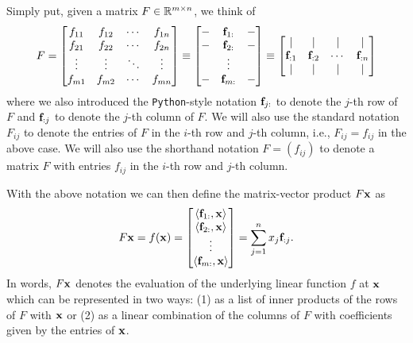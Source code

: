 Simply put, given a matrix $F \in \mathbb{R}^{m \times n}$, we think of  
\begin{equation*}
    F = \begin{bmatrix}
        f_{11} & f_{12} & \cdots & f_{1n} \\
        f_{21} & f_{22} & \cdots & f_{2n} \\
        \vdots & \vdots & \ddots & \vdots \\
        f_{m1} & f_{m2} & \cdots & f_{mn}
    \end{bmatrix} 
    \equiv 
    \begin{bmatrix}
        -  & \mathbf{f}_{1:} &  - \\
        -  & \mathbf{f}_{2:} &  - \\
         & \vdots &  \\
        -  & \mathbf{f}_{m:} &  -
    \end{bmatrix} 
    \equiv 
    \begin{bmatrix}
        |        & |        &  |  &      | \\
        \mathbf{f}_{:1} & \mathbf{f}_{:2} & \cdots & \mathbf{f}_{:n} \\
                |        & |        &  |  &      |   
    \end{bmatrix}
\end{equation*}
where we also introduced the \texttt{Python}-style notation $\mathbf{f}_{j:}$ to 
denote the $j$-th row of $F$ and $\mathbf{f}_{:j}$ to denote the $j$-th column of $F$.
We will also use the standard notation $F_{ij}$ to denote the 
entries of $F$ in the $i$-th row and $j$-th column, i.e., $F_{ij} = f_{ij}$ in the above 
case. We will also use the shorthand notation $F = (f_{ij})$ to denote a matrix $F$ with entries $f_{ij}$ in the $i$-th row and $j$-th column.

With the above notation we can then define the matrix-vector product $F \mathbf{x}$ as
\begin{equation*}
    F \mathbf{x} = f(\mathbf{x}) = \begin{bmatrix}
        \langle \mathbf{f}_{1:}, \mathbf{x} \rangle \\
        \langle \mathbf{f}_{2:}, \mathbf{x} \rangle \\
        \vdots \\
        \langle \mathbf{f}_{m:}, \mathbf{x} \rangle  
    \end{bmatrix} 
    =  
    \sum_{j=1}^n x_j \mathbf{f}_{:j}.
\end{equation*}
In words, $F \mathbf{x}$ denotes the evaluation of the underlying linear function $f$ at 
$\mathbf{x}$ which can be represented in two ways: (1) as a list of inner products of the rows of $F$ with $\mathbf{x}$ or (2) as a linear combination of the columns of $F$ with coefficients given by the entries of $\mathbf{x}$.

